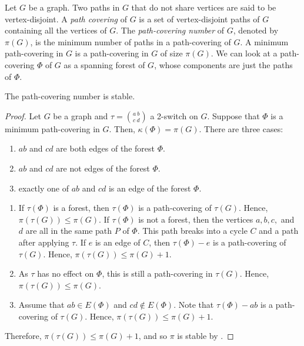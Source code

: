 \documentclass{BICA}
\begin{document}
Let $G$ be a graph. Two paths in $G$ that do not share vertices are said to be vertex-disjoint. A \emph{path covering} of $G$ is a set of vertex-disjoint paths of $G$ containing all the vertices of $G$. The \emph{path-covering number} of $G$, denoted by $\pi(G)$, is the minimum number of paths in a path-covering of $G$. A minimum path-covering in $G$ is a path-covering in $G$ of size $\pi(G)$. We can look at a path-covering $\Phi$ of $G$ as a spanning forest of $G$, whose components are just the paths of $\Phi$.

\begin{theorem}\label{Teo_Stability_PathCovering}
The path-covering number is stable.
\end{theorem}

\begin{proof}
	Let \(G\) be a graph and $\tau={{a \ b}\choose{c \ d}}$ a 2-switch on \(G\). Suppose that $\Phi$ is a minimum path-covering in $G$. Then, $\kappa(\Phi)=\pi(G)$. There are three cases:
	\begin{enumerate}
		\item \(ab\) and \(cd\) are both edges of the forest $\Phi$.
		\item \(ab\) and \(cd\) are not edges of the forest $\Phi$.
		\item exactly one of \(ab\) and \(cd\) is an edge of the forest $\Phi$.
	\end{enumerate}
	\begin{enumerate}[label=(\arabic*).]
		\item If \(\tau(\Phi)\) is a forest, then \(\tau(\Phi)\) is a path-covering of \(\tau(G)\). Hence, \(\pi(\tau(G))\leq \pi(G)\). If \(\tau(\Phi)\) is not a forest, then the vertices \(a,b,c,\) and \(d\) are all in the same path \(P\) of \(\Phi\). This path breaks into a cycle \(C\) and a path after applying \(\tau\). If \(e\) is an edge of \(C\), then \(\tau(\Phi)-e\) is a path-covering of \(\tau(G)\). Hence, \(\pi(\tau(G))\leq \pi(G)+1\).

		\item As \(\tau\) has no effect on \(\Phi\), this is still a path-covering in \(\tau(G)\). Hence, \(\pi(\tau(G))\leq \pi(G)\).

		\item Assume that \(ab \in E(\Phi)\) and \(cd \notin E(\Phi)\). Note that \(\tau(\Phi)-ab\) is a path-covering of \(\tau(G)\). Hence, \(\pi(\tau(G))\leq \pi(G)+1\).
	\end{enumerate}

	Therefore, \(\pi(\tau(G))\leq \pi(G)+1\), and so $\pi$ is stable by .
\end{proof}
\end{document}
